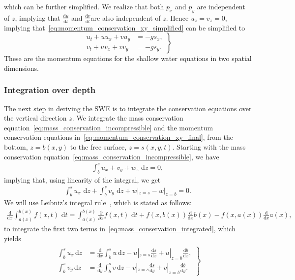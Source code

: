 which can be further simplified.
We realize that both $p_x$ and $p_y$ are independent of $z$, implying that $\frac{\text{d}u}{\text{d}t} $ and $\frac{\text{d}v}{\text{d}t} $are also independent of $z$.
Hence $u_z = v_z = 0$, implying that~\eqref{eq:momentum_conservation_xy_simplified} can be simplified to
\begin{equation}\label{eq:momentum_conservation_xy_final}
    \left.
    \begin{aligned}
        u_t + u u_x + v u_y &= -g s_x,  \\
        v_t + u v_x + v v_y &= -g s_y.
    \end{aligned}
    \right\}
\end{equation}
These are the momentum equations for the shallow water equations in two spatial dimensions.

\subsubsection*{Integration over depth}
The next step in deriving the SWE is to integrate the conservation equations over the vertical direction $z$.
We integrate the mass conservation equation~\eqref{eq:mass_conservation_incompressible} and the momentum conservation equations in~\eqref{eq:momentum_conservation_xy_final}, from the bottom, $z = b(x,y)$ to the free surface, $z = s(x,y,t)$.
Starting with the mass conservation equation~\eqref{eq:mass_conservation_incompressible}, we have
\begin{align*}
    \int_{b}^{s} u_x + v_y + w_z \text{ d} z = 0,
\end{align*}
implying that, using linearity of the integral, we get
\begin{align}\label{eq:mass_conservation_integrated}
    \int_{b}^{s} u_x \text{ d} z + \int_{b}^{s} v_y \text{ d} z  + w|_{z = s} - w|_{z = b} = 0.
\end{align}
We will use Leibniz's integral rule~\cite{Leibniz}, which is stated as follows:
\begin{align}\label{eq:leibniz_rule}
    \frac{\text{d}}{\text{d} x} \int_{a(x)}^{b(x)} f(x,t) \text{ d} t
    = \int_{a(x)}^{b(x)} \frac{\partial }{\partial x} f(x, t) \text{ d} t + f(x, b(x)) \frac{\text{d}}{\text{d} x} b(x) - f(x, a(x)) \frac{\text{d}}{\text{d} x} a(x),
\end{align}
to integrate the first two terms in~\eqref{eq:mass_conservation_integrated}, which yields
\begin{align}\label{eq:leibniz_rule_applied}
    \begin{gathered}
        \left.
        \begin{aligned}
        \int_{b}^{s} u_x \, \text{d} z &=  \frac{\text{d}}{\text{d} x}  \int_{b}^{s} u \, \text{d} z  - u|_{z = s} \frac{\text{d} s}{\text{d} x} + u|_{z = b} \frac{\text{d} b}{\text{d} x}, \\
        \int_{b}^{s} v_y \, \text{d} z &=  \frac{\text{d}}{\text{d} y}  \int_{b}^{s} v \, \text{d} z  - v|_{z = s} \frac{\text{d} s}{\text{d} y} + v|_{z = b} \frac{\text{d} b}{\text{d} y}.
        \end{aligned}
        \right\}
    \end{gathered}
\end{align}
